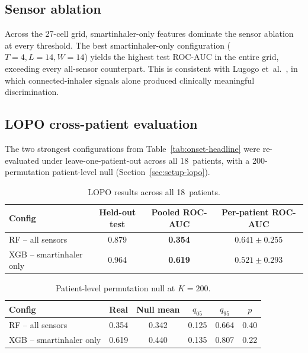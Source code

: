 \documentclass[11pt,a4paper]{article}
\newcommand{\rocauc}{ROC\nobreakdash-AUC}
\begin{document}
\subsection{Sensor ablation}\label{sec:results-ablation}

Across the 27-cell grid, smartinhaler-only features dominate the
sensor ablation at every threshold.  The best smartinhaler-only
configuration ($T=4,L=14,W=14$) yields the highest test \rocauc{}
in the entire grid, exceeding every all-sensor counterpart.  This
is consistent with Lugogo et~al.~\cite{lugogo2022}, in which
connected-inhaler signals alone produced clinically meaningful
discrimination.

\subsection{LOPO cross-patient evaluation}\label{sec:results-lopo}

The two strongest configurations from Table~\ref{tab:onset-headline}
were re-evaluated under leave-one-patient-out across all
18~patients, with a 200-permutation patient-level null
(Section~\ref{sec:setup-lopo}).

\begin{table}[H]
\centering
\caption{LOPO results across all 18~patients.}
\label{tab:lopo}
\small
\begin{tabular}{lccc}
\toprule
\textbf{Config} & \textbf{Held-out test} &
\textbf{Pooled \rocauc{}} & \textbf{Per-patient \rocauc{}} \\
\midrule
RF -- all sensors        & 0.879 & \textbf{0.354} &
$0.641 \pm 0.255$ \\
XGB -- smartinhaler only & 0.964 & \textbf{0.619} &
$0.521 \pm 0.293$ \\
\bottomrule
\end{tabular}
\end{table}

\begin{table}[H]
\centering
\caption{Patient-level permutation null at $K=200$.}
\label{tab:lopo-null}
\small
\begin{tabular}{lccccc}
\toprule
\textbf{Config} & \textbf{Real} & \textbf{Null mean} &
$q_{05}$ & $q_{95}$ & \textbf{$p$} \\
\midrule
RF -- all sensors        & 0.354 & 0.342 & 0.125 & 0.664 & 0.40 \\
XGB -- smartinhaler only & 0.619 & 0.440 & 0.135 & 0.807 & 0.22 \\
\bottomrule
\end{tabular}
\end{table}
\end{document}
